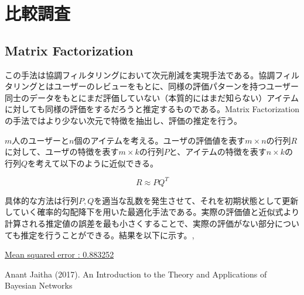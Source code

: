 \documentclass[a4j,12pt]{jarticle}
\begin{document}
\section{比較調査}

\subsection{Matrix Factorization}

この手法は協調フィルタリングにおいて次元削減を実現手法である。協調フィルタリングとはユーザーのレビューをもとに、同様の評価パターンを持つユーザー同士のデータをもとにまだ評価していない（本質的にはまだ知らない）アイテムに対しても同様の評価をするだろうと推定するものである。Matrix Factorization の手法ではより少ない次元で特徴を抽出し、評価の推定を行う。

$m$人のユーザーと$n$個のアイテムを考える。ユーザの評価値を表す$m \times n$の行列$R$に対して、ユーザの特徴を表す$m \times k$の行列$P$と、アイテムの特徴を表す$n \times k$の行列$Q$を考えて以下のように近似できる。

$$ R \approx P  Q^T$$

具体的な方法は行列$P,Q$を適当な乱数を発生させて、それを初期状態として更新していく確率的勾配降下を用いた最適化手法である。実際の評価値と近似式より計算される推定値の誤差を最も小さくすることで、実際の評価がない部分についても推定を行うことができる。結果を以下に示す。\cite{Kamo00}\cite{藤田12},

\underline{Mean squared error :  0.883252}


\begin{thebibliography}{5}
\bibitem{}  Anant Jaitha (2017). An Introduction to the Theory and Applications of Bayesian Networks 
\end{thebibliography}



\end{document}
